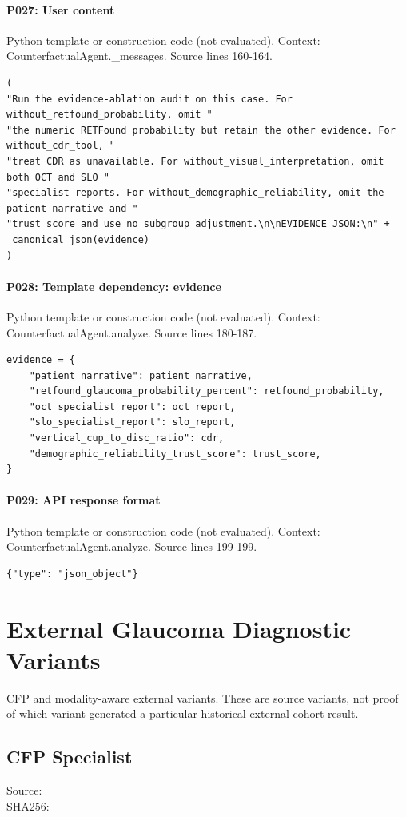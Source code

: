 \documentclass[10pt]{article}
\begin{document}
\paragraph{P027: User content}
Python template or construction code (not evaluated). Context: CounterfactualAgent.\_messages. Source lines 160-164.
\begin{Verbatim}
(
"Run the evidence-ablation audit on this case. For without_retfound_probability, omit "
"the numeric RETFound probability but retain the other evidence. For without_cdr_tool, "
"treat CDR as unavailable. For without_visual_interpretation, omit both OCT and SLO "
"specialist reports. For without_demographic_reliability, omit the patient narrative and "
"trust score and use no subgroup adjustment.\n\nEVIDENCE_JSON:\n" + _canonical_json(evidence)
)
\end{Verbatim}
\paragraph{P028: Template dependency: evidence}
Python template or construction code (not evaluated). Context: CounterfactualAgent.analyze. Source lines 180-187.
\begin{Verbatim}
evidence = {
    "patient_narrative": patient_narrative,
    "retfound_glaucoma_probability_percent": retfound_probability,
    "oct_specialist_report": oct_report,
    "slo_specialist_report": slo_report,
    "vertical_cup_to_disc_ratio": cdr,
    "demographic_reliability_trust_score": trust_score,
}
\end{Verbatim}
\paragraph{P029: API response format}
Python template or construction code (not evaluated). Context: CounterfactualAgent.analyze. Source lines 199-199.
\begin{Verbatim}
{"type": "json_object"}
\end{Verbatim}
\clearpage
\section{External Glaucoma Diagnostic Variants}
CFP and modality-aware external variants. These are source variants, not proof of which variant generated a particular historical external-cohort result.
\subsection{CFP Specialist}
Source: \\
SHA256: {\scriptsize{}}
\end{document}
